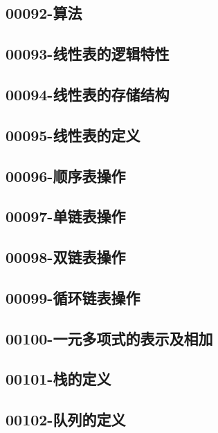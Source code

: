 \subsection{00092-算法}

\subsection{00093-线性表的逻辑特性}

\subsection{00094-线性表的存储结构}

\subsection{00095-线性表的定义}

\subsection{00096-顺序表操作}

\subsection{00097-单链表操作}

\subsection{00098-双链表操作}

\subsection{00099-循环链表操作}

\subsection{00100-一元多项式的表示及相加}

\subsection{00101-栈的定义}

\subsection{00102-队列的定义}

